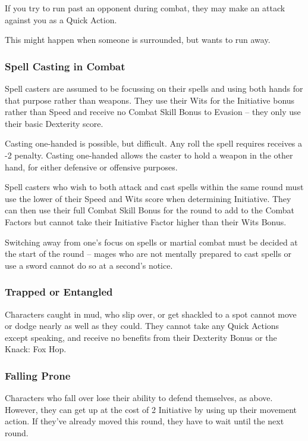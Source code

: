 \begin{multicols}{2}
If you try to run past an opponent during combat, they may make an attack against you as a Quick Action.

This might happen when someone is surrounded, but wants to run away.

\subsubsection{Spell Casting in Combat}
\label{combatcasting}

Spell casters are assumed to be focussing on their spells and using both hands for that purpose rather than weapons. They use their Wits for the Initiative bonus rather than Speed and receive no Combat Skill Bonus to Evasion -- they only use their basic Dexterity score.

Casting one-handed is possible, but difficult.
Any roll the spell requires receives a -2 penalty.
Casting one-handed allows the caster to hold a weapon in the other hand, for either defensive or offensive purposes.

Spell casters who wish to both attack and cast spells within the same \gls{round} must use the lower of their Speed and Wits score when determining Initiative. They can then use their full Combat Skill Bonus for the \gls{round} to add to the Combat Factors but cannot take their Initiative Factor higher than their Wits Bonus.

Switching away from one's focus on spells or martial combat must be decided at the start of the \gls{round} -- mages who are not mentally prepared to cast spells or use a sword cannot do so at a second's notice.

\subsubsection{Trapped or Entangled}

Characters caught in mud, who slip over, or get shackled to a spot cannot move or dodge nearly as well as they could.
They cannot take any Quick Actions except speaking, and receive no benefits from their Dexterity Bonus or the Knack: Fox Hop.

\subsubsection{Falling Prone}\label{prone}

Characters who fall over lose their ability to defend themselves, as above.  However, they can get up at the cost of 2 Initiative by using up their movement action.  If they've already moved this \gls{round}, they have to wait until the next \gls{round}.


\end{multicols}
